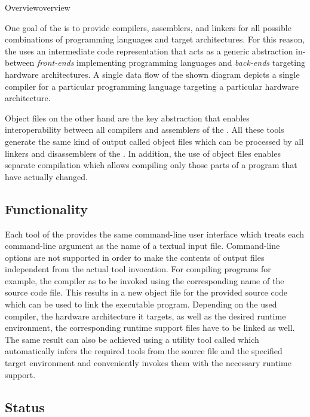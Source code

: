 \begin{presentation}{Overview}{overview}

One goal of the \ecs{} is to provide compilers, assemblers, and linkers for all possible combinations of programming languages and target architectures.
For this reason, the \ecs{} uses an intermediate code representation that acts as a generic abstraction in-between \emph{front-ends} implementing programming languages and \emph{back-ends} targeting hardware architectures.
A single data flow of the shown diagram depicts a single compiler for a particular programming language targeting a particular hardware architecture.
\seecode


Object files on the other hand are the key abstraction that enables interoperability between all compilers and assemblers of the \ecs{}.
All these tools generate the same kind of output called object files which can be processed by all linkers and disassemblers of the \ecs{}.
In addition, the use of object files enables separate compilation which allows compiling only those parts of a program that have actually changed.
\seeobject


\subsection{Functionality}

Each tool of the \ecs{} provides the same command-line user interface which treats each command-line argument as the name of a textual input file.
Command-line options are not supported in order to make the contents of output files independent from the actual tool invocation.
For compiling programs for example, the compiler as to be invoked using the corresponding name of the source code file.
This results in a new object file for the provided source code which can be used to link the executable program.
Depending on the used compiler, the hardware architecture it targets, as well as the desired runtime environment, the corresponding runtime support files have to be linked as well.
The same result can also be achieved using a utility tool called  which automatically infers the required tools from the source file and the specified target environment and conveniently invokes them with the necessary runtime support.


\subsection{Status}


\end{presentation}
